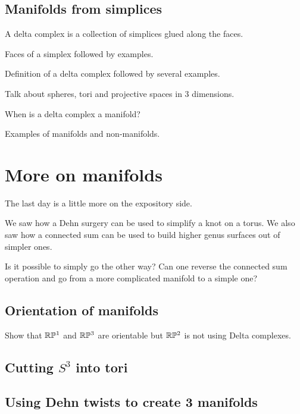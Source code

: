 \subsection{Manifolds from simplices}
A delta complex is a collection of simplices glued along the faces.

\begin{definition}
	Faces of a simplex followed by examples.
\end{definition}

\begin{definition}
	Definition of a delta complex followed by several examples.
\end{definition}

Talk about spheres, tori and projective spaces in 3 dimensions.

\begin{ques}
	When is a delta complex a manifold?
\end{ques}

Examples of manifolds and non-manifolds.






\section{More on manifolds}
The last day is a little more on the expository side.

We saw how a Dehn surgery can be used to simplify a knot on a torus. We also saw how a connected sum can be used to build higher genus surfaces out of simpler ones.

Is it possible to simply go the other way? Can one reverse the connected sum operation and go from a more complicated manifold to a simple one?

\subsection{Orientation of manifolds}

Show that $\mathbb{R}\mathbb{P}^1$ and $\mathbb{R} \mathbb{P}^3$ are orientable but $\mathbb{R}\mathbb{P}^2$ is not using Delta complexes.

\subsection{Cutting $S^3$ into tori}

\subsection{Using Dehn twists to create 3 manifolds}





